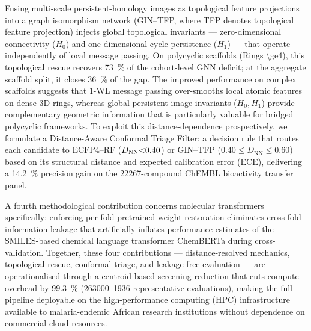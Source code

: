 \documentclass[11pt,a4paper]{article}
\begin{document}
Fusing multi-scale persistent-homology images \citep{adams2017persistence} as topological feature projections into a graph isomorphism network (GIN--TFP, where TFP denotes topological feature projection) injects global topological invariants --- zero-dimensional connectivity ($H_0$) and one-dimensional cycle persistence ($H_1$) --- that operate independently of local message passing. On polycyclic scaffolds (Rings \num{\ge4}), this topological rescue recovers \qty{73}{\percent} of the cohort-level GNN deficit; at the aggregate scaffold split, it closes \qty{36}{\percent} of the gap. The improved performance on complex scaffolds suggests that 1-WL message passing over-smooths local atomic features on dense 3D rings, whereas global persistent-image invariants ($H_0, H_1$) provide complementary geometric information that is particularly valuable for bridged polycyclic frameworks. To exploit this distance-dependence prospectively, we formulate a Distance-Aware Conformal Triage Filter: a decision rule that routes each candidate to ECFP4--RF ($D_{\mathrm{NN}}\num{<0.40}$) or GIN--TFP ($\num{0.40} \le D_{\mathrm{NN}} \le \num{0.60}$) based on its structural distance and expected calibration error (ECE), delivering a \qty{+14.2}{\percent} precision gain on the \num{22267}-compound ChEMBL bioactivity transfer panel.

A fourth methodological contribution concerns molecular transformers specifically: enforcing per-fold pretrained weight restoration eliminates cross-fold information leakage that artificially inflates performance estimates of the SMILES-based chemical language transformer ChemBERTa during cross-validation. Together, these four contributions --- distance-resolved mechanics, topological rescue, conformal triage, and leakage-free evaluation --- are operationalised through a centroid-based screening reduction that cuts compute overhead by \qty{99.3}{\percent} (\numrange{263000}{1936} representative evaluations), making the full pipeline deployable on the high-performance computing (HPC) infrastructure available to malaria-endemic African research institutions without dependence on commercial cloud resources.
\end{document}
